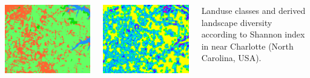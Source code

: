 \documentclass[25pt, margin=0mm, innermargin=15mm, blockverticalspace=15mm, colspace=15mm, subcolspace=8mm]{tikzposter}
\begin{document}
\begin{columns}
{\begin{minipage}{0.5\linewidth}
\includegraphics[width=\textwidth, trim={0 180 0 0}, clip]{diversity_classes}
\end{minipage}
\begin{minipage}{0.5\linewidth}
\includegraphics[width=\textwidth, trim={0 180 0 0}, clip]{diversity_shannon}
\end{minipage}

\medskip
Landuse classes and derived landscape diversity according to Shannon index in near Charlotte (North Carolina, USA).
}


\end{columns}
\end{document}
